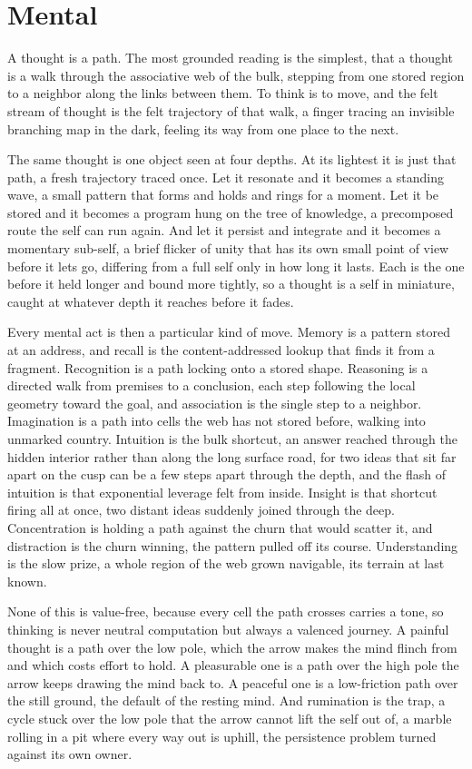 \section{Mental}

A thought is a path. The most grounded reading is the simplest, that a thought is a walk through the associative web of the bulk, stepping from one stored region to a neighbor along the links between them. To think is to move, and the felt stream of thought is the felt trajectory of that walk, a finger tracing an invisible branching map in the dark, feeling its way from one place to the next.

The same thought is one object seen at four depths. At its lightest it is just that path, a fresh trajectory traced once. Let it resonate and it becomes a standing wave, a small pattern that forms and holds and rings for a moment. Let it be stored and it becomes a program hung on the tree of knowledge, a precomposed route the self can run again. And let it persist and integrate and it becomes a momentary sub-self, a brief flicker of unity that has its own small point of view before it lets go, differing from a full self only in how long it lasts. Each is the one before it held longer and bound more tightly, so a thought is a self in miniature, caught at whatever depth it reaches before it fades.

Every mental act is then a particular kind of move. Memory is a pattern stored at an address, and recall is the content-addressed lookup that finds it from a fragment. Recognition is a path locking onto a stored shape. Reasoning is a directed walk from premises to a conclusion, each step following the local geometry toward the goal, and association is the single step to a neighbor. Imagination is a path into cells the web has not stored before, walking into unmarked country. Intuition is the bulk shortcut, an answer reached through the hidden interior rather than along the long surface road, for two ideas that sit far apart on the cusp can be a few steps apart through the depth, and the flash of intuition is that exponential leverage felt from inside. Insight is that shortcut firing all at once, two distant ideas suddenly joined through the deep. Concentration is holding a path against the churn that would scatter it, and distraction is the churn winning, the pattern pulled off its course. Understanding is the slow prize, a whole region of the web grown navigable, its terrain at last known.

None of this is value-free, because every cell the path crosses carries a tone, so thinking is never neutral computation but always a valenced journey. A painful thought is a path over the low pole, which the arrow makes the mind flinch from and which costs effort to hold. A pleasurable one is a path over the high pole the arrow keeps drawing the mind back to. A peaceful one is a low-friction path over the still ground, the default of the resting mind. And rumination is the trap, a cycle stuck over the low pole that the arrow cannot lift the self out of, a marble rolling in a pit where every way out is uphill, the persistence problem turned against its own owner.


